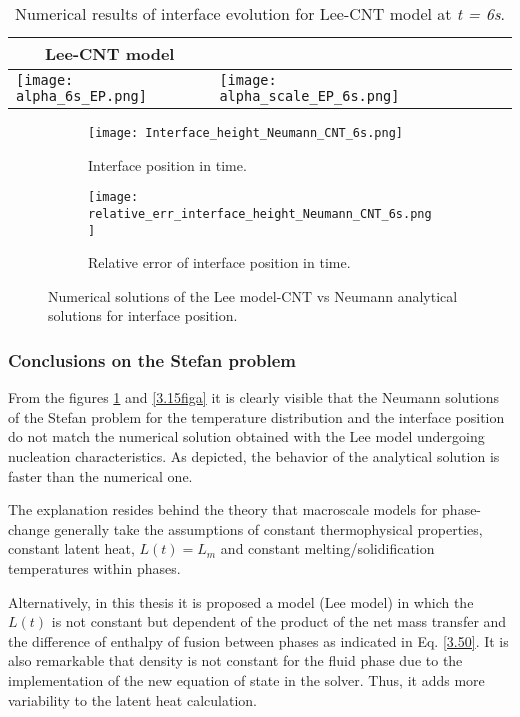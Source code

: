 \begin{table}[h!]
	\begin{tabular}{@{}lllll@{}}
		\toprule[1pt]
		\multicolumn{1}{c}{\textbf{Lee-CNT model}} \\ \midrule[2pt] 
		\texttt{[image: alpha\_6s\_EP.png]} & \texttt{[image: alpha\_scale\_EP\_6s.png]} \\ \bottomrule[1pt]		
	\end{tabular}
	\centering
	\caption{Numerical results of interface evolution for Lee-CNT model at \textit{t = 6s}.}	
	\label{3.20tab}
\end{table}
\begin{figure}[h!]
	\begin{subfigure}{0.50\textwidth}
		\texttt{[image: Interface\_height\_Neumann\_CNT\_6s.png]}\hfill
		\caption{Interface position in time.}\label{3.16figa}
	\end{subfigure}
	\begin{subfigure}{0.50\textwidth}
		\texttt{[image: relative\_err\_interface\_height\_Neumann\_CNT\_6s.png]}	
		\caption{Relative error of interface position in time.}\label{3.16figb}
	\end{subfigure}
	\caption{Numerical solutions of the Lee model-CNT vs Neumann analytical solutions for interface position.}
\label{3.16fig}
\end{figure}

\subsubsection{Conclusions on the Stefan problem}
From the figures \ref{3.16figa} and \ref{3.15figa} it is clearly visible that the Neumann solutions of the Stefan problem for the temperature distribution and the interface position do not match the numerical solution obtained with the Lee model undergoing nucleation characteristics. As depicted, the behavior of the analytical solution is faster than the numerical one. 
 
\noindent The explanation resides behind the theory that macroscale models for phase-change generally take the assumptions of constant thermophysical properties, constant latent heat, $L(t) = L_{m}$ and constant melting/solidification temperatures within phases. 

\noindent Alternatively, in this thesis it is proposed a model (Lee model) in which the $L(t)$ is not constant but dependent of the product of the net mass transfer and the difference of enthalpy of fusion between phases as indicated in Eq. \ref{3.50}. It is also remarkable that density is not constant for the fluid phase due to the implementation of the new equation of state in the solver. Thus, it adds more variability to the latent heat calculation.

